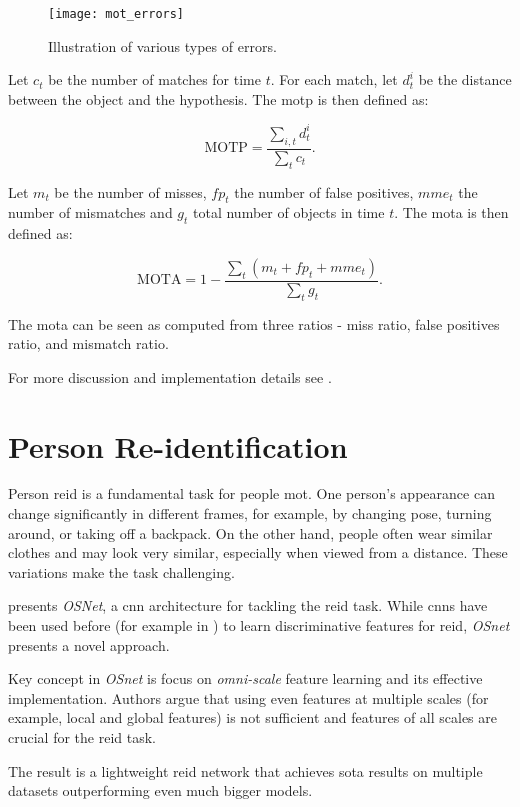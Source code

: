\begin{figure}[ht]
    \centering
    \texttt{[image: mot\_errors]}
    \caption[Illustration of various types of errors.]{Illustration of various types of errors.\cite{bernardin2008evaluating_Clear_mot_metrics}}
    \label{fig:mot_errors}
\end{figure}

Let $c_t$ be the number of matches for time $t$. For each match, let $d_t^i$ be the distance between the object and the hypothesis. The \gls{motp} is then defined as:

$$
\text{MOTP} = \frac{ \sum_{i,t}d_t^i }{ \sum_t c_t }.
$$

Let $m_t$ be the number of misses, $\mathit{fp}_t$ the number of false positives, $\mathit{mme}_t$ the number of mismatches and $g_t$ total number of objects in time $t$. The \gls{mota} is then defined as:

$$
\text{MOTA} = 1 - \frac{ \sum_t(m_t + \mathit{fp}_t + \mathit{mme}_t) }{ \sum_t g_t  }.
$$

The \gls{mota} can be seen as computed from three ratios - miss ratio, false positives ratio, and mismatch ratio.

For more discussion and implementation details see \cite{bernardin2008evaluating_Clear_mot_metrics}.

\section{Person Re-identification}\label{s:reid}

Person \gls{reid} is a fundamental task for people \gls{mot}. One person's appearance can change significantly in different frames, for example, by changing pose, turning around, or taking off a backpack. On the other hand, people often wear similar clothes and may look very similar, especially when viewed from a distance. These variations make the task challenging.

\cite{osnet} presents \textit{OSNet}, a \gls{cnn} architecture for tackling the \gls{reid} task. While \glspl{cnn} have been used before (for example in \cite{Wojke2017_DeepSORT}) to learn discriminative features for \gls{reid}, \textit{OSnet} presents a novel approach.

Key concept in \textit{OSnet} is focus on \textit{omni-scale} feature learning and its effective implementation. Authors argue that using even features at multiple scales (for example, local and global features) is not sufficient and features of all scales are crucial for the \gls{reid} task.

The result is a lightweight \gls{reid} network that achieves \gls{sota} results on multiple datasets outperforming even much bigger models.\cite{osnet}

